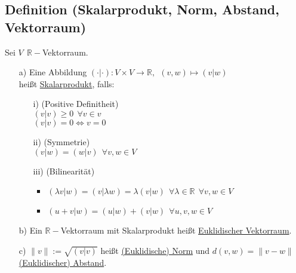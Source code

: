 \documentclass[a4paper, 12pt,titlepage, pdf, headsepline]{article}
\newcommand{\R}{\mathds{R}}
\newcommand{\uline}[1]{\underline{#1}}
\renewcommand{\>}{\rightarrow}
\renewcommand{\*}{\cdot}
\begin{document}
\subsection{Definition (Skalarprodukt, Norm, Abstand, Vektorraum)}
\label{10.2}
Sei $V ~~\R-$Vektorraum.
\begin{itemize}
	\item[a)] Eine Abbildung $(\cdot | \cdot): V \times V \rightarrow \R,~~ (v,w)\mapsto (v|w)$\\
	heißt \uline{Skalarprodukt}, falls:
	\begin{itemize}
		\item[i)] (Positive Definitheit)\\
		$(v|v) \geq 0 ~~\forall v \in v$\\
		$(v|v) = 0 \Leftrightarrow v= 0$ 
		\item[ii)] (Symmetrie)\\$(v|w) = (w|v)~~ \forall v,w \in V$ 
		\item[iii)] (Bilinearität)
		\begin{itemize}
			\item $(\lambda v|w) = (v|\lambda w) = \lambda(v|w)~~ \forall \lambda \in \R ~~\forall v,w \in V$
			\item $(u+v | w) = (u|w) + (v|w) ~~\forall u,v,w \in V$
		\end{itemize}
		
	\end{itemize}
	\item[b)] Ein $\R-$Vektorraum mit Skalarprodukt heißt \uline{Euklidischer Vektorraum}.
	\item[c)] $\|v\| := \sqrt{(v|v)}$ heißt \uline{(Euklidische) Norm} und $d(v,w) = \|v -w\|$ \uline{(Euklidischer) Abstand}.
\end{itemize}
\end{document}

